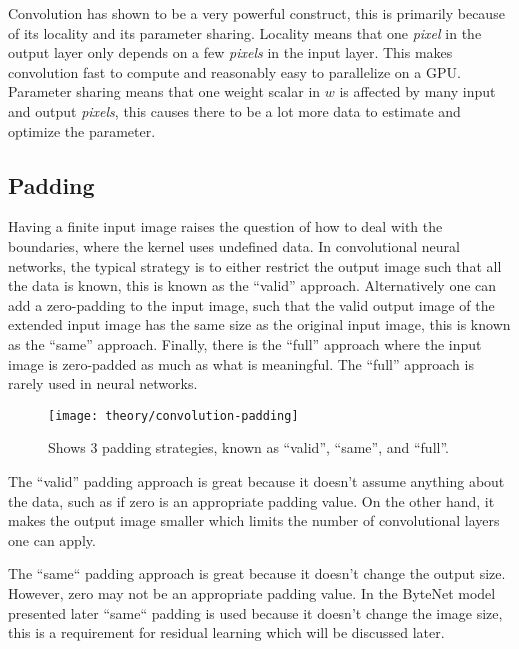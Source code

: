 Convolution has shown to be a very powerful construct, this is primarily because of its locality and its parameter sharing. Locality means that one \textit{pixel} in the output layer only depends on a few \textit{pixels} in the input layer. This makes convolution fast to compute and reasonably easy to parallelize on a GPU. Parameter sharing means that one weight scalar in $w$ is affected by many input and output \textit{pixels}, this causes there to be a lot more data to estimate and optimize the parameter.

\subsection{Padding}
Having a finite input image raises the question of how to deal with the boundaries, where the kernel uses undefined data. In convolutional neural networks, the typical strategy is to either restrict the output image such that all the data is known, this is known as the ``valid'' approach. Alternatively one can add a zero-padding to the input image, such that the valid output image of the extended input image has the same size as the original input image, this is known as the ``same'' approach. Finally, there is the ``full'' approach where the input image is zero-padded as much as what is meaningful. The ``full'' approach is rarely used in neural networks.

\begin{figure}[h]
	\centering
	\texttt{[image: theory/convolution-padding]}
	\caption{Shows 3 padding strategies, known as ``valid'', ``same'', and ``full''.}
	\label{fig:convolution:padding}
\end{figure}

The ``valid'' padding approach is great because it doesn't assume anything about the data, such as if zero is an appropriate padding value. On the other hand, it makes the output image smaller which limits the number of convolutional layers one can apply.

The ``same`` padding approach is great because it doesn't change the output size. However, zero may not be an appropriate padding value. In the ByteNet model presented later ``same`` padding is used because it doesn't change the image size, this is a requirement for residual learning which will be discussed later.

